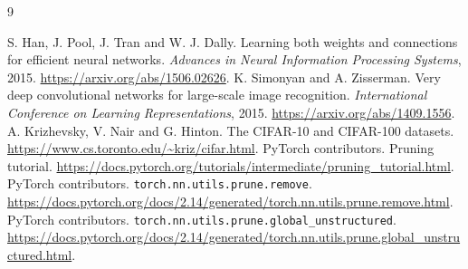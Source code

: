 \documentclass[11pt,a4paper]{article}
\newcommand{\code}[1]{\texttt{#1}}
\begin{document}
\begin{thebibliography}{9}
\raggedright
{}
S. Han, J. Pool, J. Tran and W. J. Dally.
\newblock Learning both weights and connections for efficient neural networks.
\newblock \emph{Advances in Neural Information Processing Systems}, 2015.
\newblock \url{https://arxiv.org/abs/1506.02626}.
K. Simonyan and A. Zisserman.
\newblock Very deep convolutional networks for large-scale image recognition.
\newblock \emph{International Conference on Learning Representations}, 2015.
\newblock \url{https://arxiv.org/abs/1409.1556}.
A. Krizhevsky, V. Nair and G. Hinton.
\newblock The CIFAR-10 and CIFAR-100 datasets.
\newblock \url{https://www.cs.toronto.edu/~kriz/cifar.html}.
PyTorch contributors. Pruning tutorial.
\newblock \url{https://docs.pytorch.org/tutorials/intermediate/pruning_tutorial.html}.
PyTorch contributors. \code{torch.nn.utils.prune.remove}.
\newblock \url{https://docs.pytorch.org/docs/2.14/generated/torch.nn.utils.prune.remove.html}.
PyTorch contributors. \code{torch.nn.utils.prune.global\_unstructured}.
\newblock \url{https://docs.pytorch.org/docs/2.14/generated/torch.nn.utils.prune.global_unstructured.html}.
\end{thebibliography}
\end{document}
